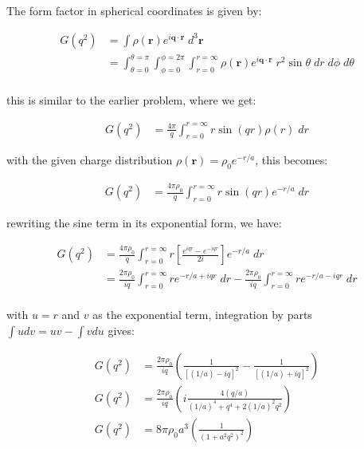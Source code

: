\documentclass[11pt]{article}
\theoremstyle{definition}
\begin{document}
The form factor in spherical coordinates is given by:

\begin{align}
    G(q^2) &= \int \rho(\mathbf{r}) e^{i\mathbf{q}\cdot\mathbf{r}}\; d^3\mathbf{r}\\
    &= \int_{\theta=0}^{\theta=\pi}
    \int_{\phi=0}^{\phi=2\pi}
    \int_{r=0}^{r=\infty}  \rho(\mathbf{r})e^{i\mathbf{q}\cdot\mathbf{r}} \; r^2 \sin\theta\; dr\; d\phi\; d\theta\\
\end{align}

this is similar to the earlier problem, where we get:

\begin{align}
    G(q^2) &= \frac{4\pi}{q} \int_{r=0}^{r=\infty} 
    r\sin(qr)   \rho(r) \; dr
\end{align}

with the given charge distribution $\rho(\mathbf{r}) = \rho_0 e^{-r/a}$, this becomes:

\begin{align}
    G(q^2) &= \frac{4\pi\rho_0}{q} \int_{r=0}^{r=\infty} 
    r\sin(qr)  e^{-r/a}\; dr
\end{align}

rewriting the sine term in its exponential form, we have:

\begin{align}
    G(q^2) &= \frac{4\pi\rho_0}{q} \int_{r=0}^{r=\infty} 
    r \left[\frac{e^{iqr}-e^{-iqr}}{2i}\right] e^{-r/a}\; dr\\
    &= \frac{2\pi\rho_0}{iq} \int_{r=0}^{r=\infty} 
    r e^{-r/a+iqr} \; dr -  \frac{2\pi\rho_0}{iq} \int_{r=0}^{r=\infty} 
    re^{-r/a-iqr}\; dr\\
\end{align}

with $u=r$ and $v$ as the exponential term, integration by parts $\int udv = uv-\int vdu$ gives:

\begin{align}
    G(q^2) &= \frac{2\pi\rho_0}{iq} 
    \left(
       \frac{1}{[(1/a)-iq]^2} - \frac{1}{[(1/a)+iq]^2}
    \right)\\
    G(q^2) &= \frac{2\pi\rho_0}{iq} 
    \left( i\frac{4(q/a)}{(1/a)^4+q^4+2(1/a)^2q^2}\right)\\
    G(q^2) &= 8\pi\rho_0 a^3 \left(\frac{1}{(1+a^2q^2)^2}\right) 
\end{align}
\end{document}
